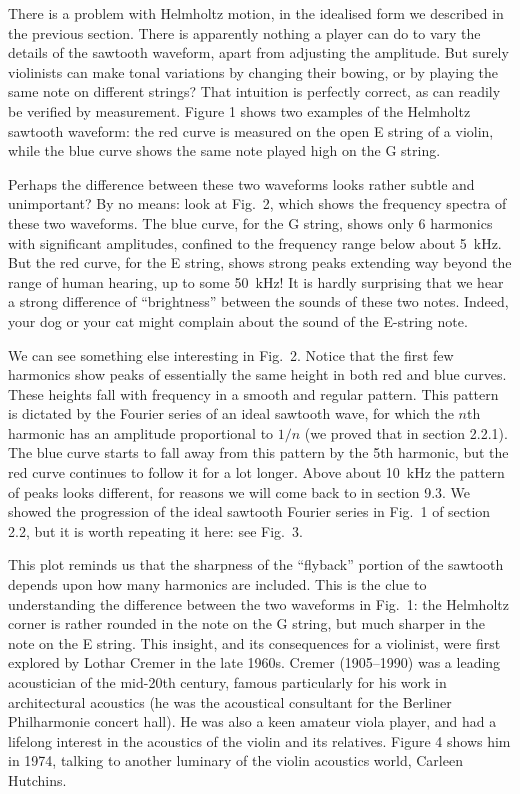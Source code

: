 

  There is a problem with Helmholtz motion, in the idealised form we described 
  in the previous section. There is apparently nothing a player can do to vary 
  the details of the sawtooth waveform, apart from adjusting the amplitude. But 
  surely violinists can make tonal variations by changing their bowing, or by 
  playing the same note on different strings? That intuition is perfectly 
  correct, as can readily be verified by measurement. Figure 1 shows two 
  examples of the Helmholtz sawtooth waveform: the red curve is measured on the 
  open E string of a violin, while the blue curve shows the same note played 
  high on the G string. 

  Perhaps the difference between these two waveforms looks rather subtle and 
  unimportant? By no means: look at Fig.\ 2, which shows the frequency spectra 
  of these two waveforms. The blue curve, for the G string, shows only 6 
  harmonics with significant amplitudes, confined to the frequency range below 
  about 5~kHz. But the red curve, for the E string, shows strong peaks 
  extending way beyond the range of human hearing, up to some 50~kHz! It is 
  hardly surprising that we hear a strong difference of “brightness” between 
  the sounds of these two notes. Indeed, your dog or your cat might complain 
  about the sound of the E-string note. 

  We can see something else interesting in Fig.\ 2. Notice that the first few 
  harmonics show peaks of essentially the same height in both red and blue 
  curves. These heights fall with frequency in a smooth and regular pattern. 
  This pattern is dictated by the Fourier series of an ideal sawtooth wave, for 
  which the $n$th harmonic has an amplitude proportional to $1/n$ (we proved 
  that in section 2.2.1). The blue curve starts to fall away from this pattern 
  by the 5th harmonic, but the red curve continues to follow it for a lot 
  longer. Above about 10~kHz the pattern of peaks looks different, for reasons 
  we will come back to in section 9.3. We showed the progression of the ideal 
  sawtooth Fourier series in Fig.\ 1 of section 2.2, but it is worth repeating 
  it here: see Fig.\ 3. 

  This plot reminds us that the sharpness of the “flyback” portion of the 
  sawtooth depends upon how many harmonics are included. This is the clue to 
  understanding the difference between the two waveforms in Fig.\ 1: the 
  Helmholtz corner is rather rounded in the note on the G string, but much 
  sharper in the note on the E string. This insight, and its consequences for a 
  violinist, were first explored by Lothar Cremer in the late 1960s. Cremer 
  (1905--1990) was a leading acoustician of the mid-20th century, famous 
  particularly for his work in architectural acoustics (he was the acoustical 
  consultant for the Berliner Philharmonie concert hall). He was also a keen 
  amateur viola player, and had a lifelong interest in the acoustics of the 
  violin and its relatives. Figure 4 shows him in 1974, talking to another 
  luminary of the violin acoustics world, Carleen Hutchins. 

